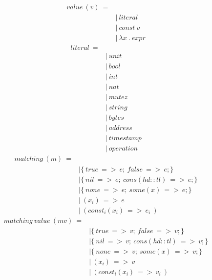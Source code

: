 \documentclass[10pt,a4paper]{article}
\begin{document}
\begin{align*}
value\ (v)\ = 
\\
 \ &|\ literal                          \tag{values\ of\ built-in\ types}
\\
 \ &|\ const\ v                          \tag{values\ of\ construct\ types}
\\
 \ &|\ \lambda x\ .\ expr                        \tag{lambda}
\end{align*}
\begin{align*}
literal\ =
\\
 \ &|\ unit                             \tag{}
\\
 \ &|\ bool                             \tag{}
\\
 \ &|\ int                              \tag{}
\\
 \ &|\ nat                              \tag{}
\\
 \ &|\ mutez                            \tag{}
\\
 \ &|\ string                           \tag{}
\\
 \ &|\ bytes                            \tag{}
\\
 \ &|\ address                          \tag{}
\\
 \ &|\ timestamp                        \tag{}
\\
 \ &|\ operation                        \tag{}
\end{align*}
\begin{align*}
matching\ (m)\ = 
\\
 \ &| \{\ true\ =>\ e;\ false\ =>\ e;\}        \tag{match\ bool}
\\
 \ &| \{\ nil \ =>\ e;\ cons(hd::tl)\ =>\ e;\} \tag{match\ list}
\\
 \ &| \{\ none\ =>\ e;\ some(x) \ =>\ e;\}     \tag{match\ option}
\\
 \ &|\ (x_i) \ =>\ e                      \tag{match\ tuple}
\\
 \ &|\ (const_i(x_i)\ =>\ e_i\ )           \tag{match\ variant}
\end{align*}
\begin{align*}
matching\ value\ (mv)\ = 
\\
 \ &| \{\ true\ =>\ v;\ false\ =>\ v;\}        \tag{match\ bool\ value}
\\
 \ &| \{\ nil \ =>\ v;\ cons(hd::tl)\ =>\ v;\} \tag{match\ list\ value}
\\
 \ &| \{\ none\ =>\ v;\ some(x) \ =>\ v;\}     \tag{match\ option\ value}
\\
 \ &|\ (x_i) \ =>\ v                      \tag{match\ tuple\ value}
\\
 \ &|\ (const_i(x_i)\ =>\ v_i\ )           \tag{match\ variant\ value}
\end{align*}
\end{document}
